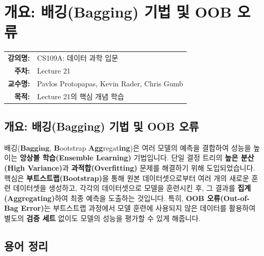 \documentclass[11pt,a4paper]{book}
\makeatletter
\theoremstyle{definition}
\newcommand{\metainfo}[4]{
\begin{tcolorbox}[
    colback=lightpurple,
    colframe=darkpurple,
    boxrule=1pt,
    arc=2mm,
    left=10pt,
    right=10pt,
    top=8pt,
    bottom=8pt
]
\begin{tabular}{@{}rl@{}}
\textbf{강의명:} & #1 \\[0.3em]
\textbf{주차:} & #2 \\[0.3em]
\textbf{교수명:} & #3 \\[0.3em]
\textbf{목적:} & \begin{minipage}[t]{0.75\textwidth}#4\end{minipage}
\end{tabular}
\end{tcolorbox}
}
\makeatother
\begin{document}
\chapter{개요: 배깅(Bagging) 기법 및 OOB 오류}
\label{ch:lecture21}

\metainfo{CS109A: 데이터 과학 입문}{Lecture 21}{Pavlos Protopapas, Kevin Rader, Chris Gumb}{Lecture 21의 핵심 개념 학습}


\section{개요: 배깅(Bagging) 기법 및 OOB 오류}
\label{sec:overview}

\begin{summarybox}[title={문서 핵심 요약}]
배깅($\mathbf{Bagging}$, \textbf{B}ootstrap \textbf{Agg}regat\textbf{ing})은 여러 모델의 예측을 결합하여 성능을 높이는 \textbf{앙상블 학습(Ensemble Learning)} 기법입니다.
단일 결정 트리의 \textbf{높은 분산(High Variance)}과 \textbf{과적합(Overfitting)} 문제를 해결하기 위해 도입되었습니다.
핵심은 \textbf{부트스트랩(Bootstrap)}을 통해 원본 데이터셋으로부터 여러 개의 새로운 훈련 데이터셋을 생성하고, 각각의 데이터셋으로 모델을 훈련시킨 후, 그 결과를 \textbf{집계(Aggregating)}하여 최종 예측을 도출하는 것입니다.
특히, \textbf{OOB 오류(Out-of-Bag Error)}는 부트스트랩 과정에서 모델 훈련에 사용되지 않은 데이터를 활용하여 별도의 \textbf{검증 세트} 없이도 모델의 성능을 평가할 수 있게 해줍니다.
\end{summarybox}


\section{용어 정리}
\label{sec:terms}
\end{document}
